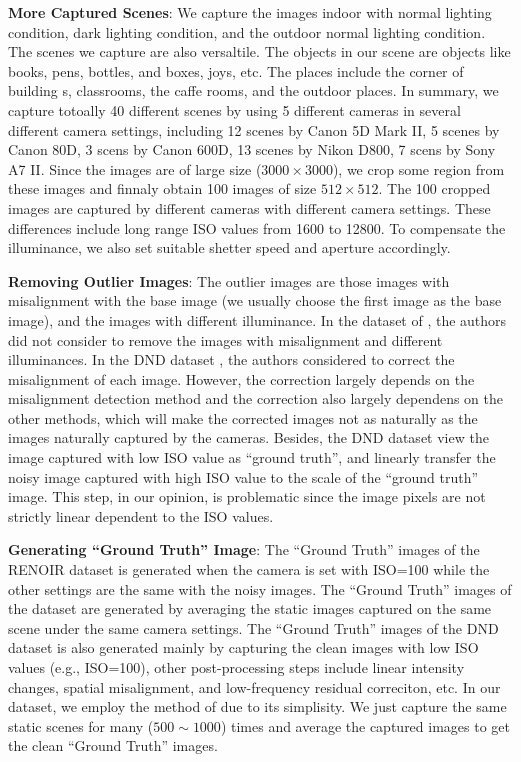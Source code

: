 \textbf{More Captured Scenes}: We capture the images indoor with normal lighting condition, dark lighting condition, and the outdoor normal lighting condition. The scenes we capture are also versaltile. The objects in our scene are objects like books, pens, bottles, and boxes, joys, etc. The places include the corner of building s, classrooms, the caffe rooms, and the outdoor places. In summary, we capture totoally 40 different scenes by using 5 different cameras in several different camera settings, including 12 scenes by Canon 5D Mark II, 5 scenes by Canon 80D, 3 scens by Canon 600D, 13 scenes by Nikon D800, 7 scens by Sony A7 II. Since the images are of large size ($3000\times3000$), we crop some region from these images and finnaly obtain 100 images of size $512\times512$. The 100 cropped images are captured by different cameras with different camera settings. These differences include long range ISO values from 1600 to 12800. To compensate the illuminance, we also set suitable shetter speed and aperture accordingly. 

\textbf{Removing Outlier Images}: The outlier images are those images with misalignment with the base image (we usually choose the first image as the base image), and the images with different illuminance. In the dataset of \cite{crosschannel2016}, the authors did not consider to remove the images with misalignment and different illuminances. In the DND dataset \cite{dnd2017}, the authors considered to correct the misalignment of each image. However, the correction largely depends on the misalignment detection method and the correction also largely dependens on the other methods, which will make the corrected images not as naturally as the images naturally captured by the cameras. Besides, the DND dataset \cite{dnd2017} view the image captured with low ISO value as ``ground truth'', and linearly transfer the noisy image captured with high ISO value to the scale of the ``ground truth'' image. This step, in our opinion, is problematic since the image pixels are not strictly linear dependent to the ISO values. 
 
\textbf{Generating ``Ground Truth'' Image}: The ``Ground Truth'' images of the RENOIR dataset \cite{RENOIR2014} is generated when the camera is set with ISO=100 while the other settings are the same with the noisy images. The ``Ground Truth'' images of the dataset \cite{crosschannel2016} are generated by averaging the static images captured on the same scene under the same camera settings. The ``Ground Truth'' images of the DND dataset \cite{dnd2017} is also generated mainly by capturing the clean images with low ISO values (e.g., ISO=100), other post-processing steps include linear intensity changes, spatial misalignment, and low-frequency residual correciton, etc. In our dataset, we employ the method of \cite{crosschannel2016} due to its simplisity. We just capture the same static scenes for many ($500\sim1000$) times and average the captured images to get the clean ``Ground Truth'' images. 

